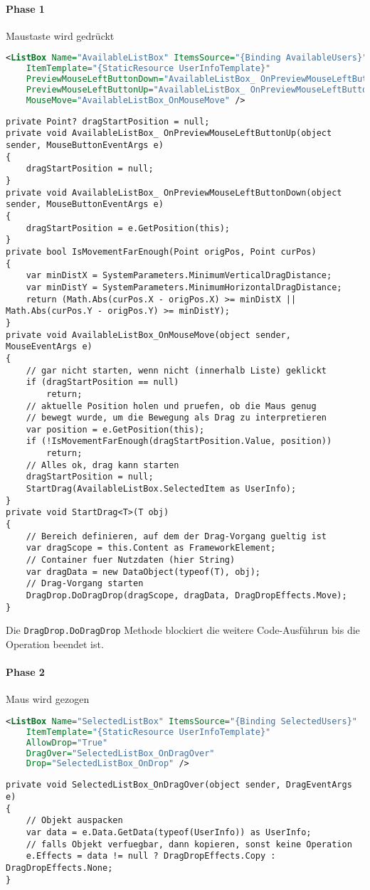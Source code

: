 \paragraph{Phase 1} Maustaste wird gedrückt
\begin{lstlisting}[language=xml]
<ListBox Name="AvailableListBox" ItemsSource="{Binding AvailableUsers}"
    ItemTemplate="{StaticResource UserInfoTemplate}"
    PreviewMouseLeftButtonDown="AvailableListBox_ OnPreviewMouseLeftButtonDown"
    PreviewMouseLeftButtonUp="AvailableListBox_ OnPreviewMouseLeftButtonUp"
    MouseMove="AvailableListBox_OnMouseMove" />
\end{lstlisting}
\begin{lstlisting}
private Point? dragStartPosition = null;
private void AvailableListBox_ OnPreviewMouseLeftButtonUp(object sender, MouseButtonEventArgs e)
{
    dragStartPosition = null;
}
private void AvailableListBox_ OnPreviewMouseLeftButtonDown(object sender, MouseButtonEventArgs e)
{
    dragStartPosition = e.GetPosition(this);
}
private bool IsMovementFarEnough(Point origPos, Point curPos)
{
    var minDistX = SystemParameters.MinimumVerticalDragDistance;
    var minDistY = SystemParameters.MinimumHorizontalDragDistance;
    return (Math.Abs(curPos.X - origPos.X) >= minDistX || Math.Abs(curPos.Y - origPos.Y) >= minDistY);
}
private void AvailableListBox_OnMouseMove(object sender, MouseEventArgs e)
{
    // gar nicht starten, wenn nicht (innerhalb Liste) geklickt
    if (dragStartPosition == null)
        return;
    // aktuelle Position holen und pruefen, ob die Maus genug
    // bewegt wurde, um die Bewegung als Drag zu interpretieren
    var position = e.GetPosition(this);
    if (!IsMovementFarEnough(dragStartPosition.Value, position))
        return;
    // Alles ok, drag kann starten
    dragStartPosition = null;
    StartDrag(AvailableListBox.SelectedItem as UserInfo);
}
private void StartDrag<T>(T obj)
{
    // Bereich definieren, auf dem der Drag-Vorgang gueltig ist
    var dragScope = this.Content as FrameworkElement;
    // Container fuer Nutzdaten (hier String)
    var dragData = new DataObject(typeof(T), obj);
    // Drag-Vorgang starten
    DragDrop.DoDragDrop(dragScope, dragData, DragDropEffects.Move);
}
\end{lstlisting}
Die \verb+DragDrop.DoDragDrop+ Methode blockiert die weitere Code-Ausführun bis die Operation beendet ist.
\paragraph{Phase 2} Maus wird gezogen
\begin{lstlisting}[language=xml]
<ListBox Name="SelectedListBox" ItemsSource="{Binding SelectedUsers}"
    ItemTemplate="{StaticResource UserInfoTemplate}"
    AllowDrop="True"
    DragOver="SelectedListBox_OnDragOver"
    Drop="SelectedListBox_OnDrop" />
\end{lstlisting}
\begin{lstlisting}
private void SelectedListBox_OnDragOver(object sender, DragEventArgs e)
{
    // Objekt auspacken
    var data = e.Data.GetData(typeof(UserInfo)) as UserInfo;
    // falls Objekt verfuegbar, dann kopieren, sonst keine Operation
    e.Effects = data != null ? DragDropEffects.Copy : DragDropEffects.None;
}
\end{lstlisting}
